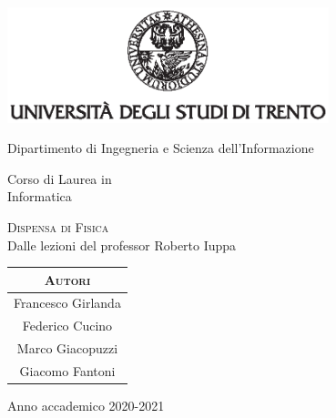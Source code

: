 \documentclass[class=book, crop=false, oneside]{standalone}
\begin{document}
\begin{titlepage}
	\centering
	\includegraphics[width=0.7\textwidth, keepaspectratio]{logo-unitn.eps}

	\vspace{1.3cm}
	\LARGE{Dipartimento di Ingegneria e Scienza dell'Informazione\\}

	\vspace{.9cm}
	\Large{Corso di Laurea in\\ Informatica}

	\vspace{.9cm}
	\Huge\textsc{Dispensa di Fisica\\}
	\vspace{.3cm}
	\large{Dalle lezioni del professor Roberto Iuppa}

	\vspace{2.8cm}

    {
    \centering
    \begin{tabular}{c}
    \LARGE\textsc{Autori} \\
    \hline
    \rule{0pt}{0.6cm}  
	Francesco Girlanda \\
	Federico Cucino \\
    Marco Giacopuzzi \\
	Giacomo Fantoni\\
    \end{tabular}
    } 

	\vspace{2.2cm}
	\LARGE{Anno accademico 2020-2021}
\end{titlepage}
\end{document}
